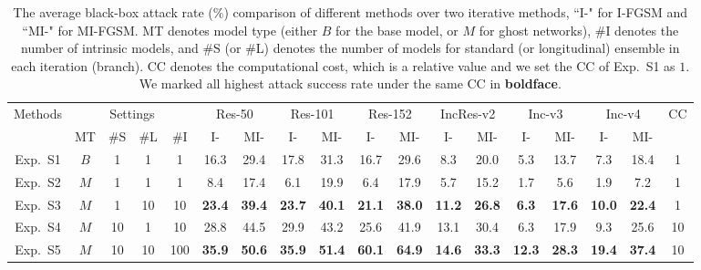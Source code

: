 \documentclass[letterpaper]{article} %
\begin{document}
\begin{table}[tb]
\centering
\small
\begin{tabular}{|c|cccc||cc|cc|cc|cc|cc|cc||c|}
\hline
\multirow{2}{*}{Methods} & \multicolumn{4}{c||}{Settings} & \multicolumn{2}{c|}{Res-50} & \multicolumn{2}{c|}{Res-101} & \multicolumn{2}{c|}{Res-152} & \multicolumn{2}{c|}{IncRes-v2} & \multicolumn{2}{c|}{Inc-v3} & \multicolumn{2}{c||}{Inc-v4} & \multirow{2}{*}{CC}\\ 
\cline{2-17} 
& MT & \#S & \#L & \#I & I- & MI- & I- & MI- & I- & MI- & I- & MI- & I- & MI- & I- & MI- &\\ 
\hline
\hline
Exp.~S1 & $B$ & 1  & 1  &   1 & 16.3 & 29.4 & 17.8 & 31.3 & 16.7 & 29.6 &  8.3 & 20.0 &  5.3 & 13.7 &  7.3 & 18.4 & 1 \\ 
Exp.~S2 & $M$ & 1  & 1  &   1 &  8.4 & 17.4 &  6.1 & 19.9 &  6.4 & 17.9 &  5.7 & 15.2 &  1.7 &  5.6 &  1.9 &  7.2 & 1 \\ 
Exp.~S3 & $M$ & 1  & 10 &  10 & \textbf{23.4} & \textbf{39.4} & \textbf{23.7} & \textbf{40.1} & \textbf{21.1} & \textbf{38.0} & \textbf{11.2} & \textbf{26.8} &  \textbf{6.3} & \textbf{17.6} & \textbf{10.0} & \textbf{22.4} & 1 \\ \hline
Exp.~S4 & $M$ & 10 & 1  &  10 & 28.8 & 44.5 & 29.9 & 43.2 & 25.6 & 41.9 & 13.1 & 30.4 &  6.3 & 17.9 &  9.3 & 25.6 & 10 \\ 
Exp.~S5 & $M$ & 10 & 10 & 100 & \textbf{35.9} & \textbf{50.6} & \textbf{35.9} & \textbf{51.4} & \textbf{60.1} & \textbf{64.9} & \textbf{14.6} & \textbf{33.3} & \textbf{12.3} & \textbf{28.3} & \textbf{19.4} & \textbf{37.4} & 10 \\ 
\hline
\end{tabular}
\caption{The average black-box attack rate (\%) comparison of different methods over two iterative methods, ``I-" for I-FGSM and ``MI-" for MI-FGSM. MT denotes model type (either $B$ for the base model, or $M$ for ghost networks), \#I denotes the number of intrinsic models, and \#S (or \#L) denotes the number of models for standard (or longitudinal) ensemble in each iteration (branch). CC denotes the computational cost, which is a relative value and we set the CC of Exp.~S1 as $1$. We marked all highest attack success rate under the same CC in \textbf{boldface}.}
\label{table: SingleModelAttack}
\end{table}
\end{document}
